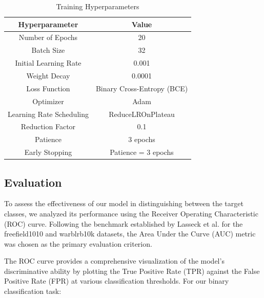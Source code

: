       \begin{table}[h]
            \centering
            \caption{Training Hyperparameters}
            \label{tab:training_hyperparameters}
            \begin{tabular}{|c|c|}
                \hline
                \textbf{Hyperparameter} & \textbf{Value} \\
                \hline
                Number of Epochs & 20 \\
                \hline
                Batch Size & 32 \\
                \hline
                Initial Learning Rate & 0.001 \\
                \hline
                Weight Decay & 0.0001 \\
                \hline
                Loss Function & Binary Cross-Entropy (BCE) \\
                \hline
                Optimizer & Adam \\
                \hline
                Learning Rate Scheduling & ReduceLROnPlateau \\
                \hline
                Reduction Factor & 0.1 \\
                \hline
                Patience & 3 epochs \\
                \hline
                Early Stopping & Patience = 3 epochs \\
                \hline
            \end{tabular}
      \end{table}
            
      \newpage   
      \subsection{Evaluation}
      To assess the effectiveness of our model in distinguishing between the target classes, we analyzed its performance using the Receiver Operating Characteristic (ROC) curve. Following the benchmark established by Lasseck et al.\cite{lasseck2018acoustic} for the freefield1010 and warblrb10k datasets, the Area Under the Curve (AUC) metric was chosen as the primary evaluation criterion.

      The ROC curve provides a comprehensive visualization of the model's discriminative ability by plotting the True Positive Rate (TPR) against the False Positive Rate (FPR) at various classification thresholds. For our binary classification task:

